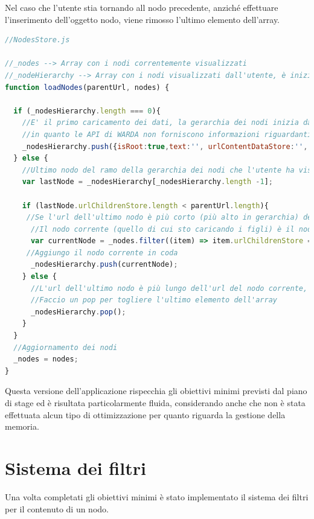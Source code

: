 Nel caso che l'utente stia tornando all nodo precedente, anziché effettuare l'inserimento dell'oggetto nodo, viene rimosso l'ultimo elemento dell'array. 

\begin{lstlisting}[language=JavaScript, caption=NodesStore - Caricamento dei nodi]
//NodesStore.js

//_nodes --> Array con i nodi correntemente visualizzati
//_nodeHierarchy --> Array con i nodi visualizzati dall'utente, è inizializzato come array vuoto
function loadNodes(parentUrl, nodes) {

  if (_nodesHierarchy.length === 0){
    //E' il primo caricamento dei dati, la gerarchia dei nodi inizia da un nodo "finto" che funziona da radice
    //in quanto le API di WARDA non forniscono informazioni riguardanti il nodo radice di una gallery
    _nodesHierarchy.push({isRoot:true,text:'', urlContentDataStore:'', urlChildrenStore:''});
  } else {
    //Ultimo nodo del ramo della gerarchia dei nodi che l'utente ha visualizzato
    var lastNode = _nodesHierarchy[_nodesHierarchy.length -1];

    if (lastNode.urlChildrenStore.length < parentUrl.length){
     //Se l'url dell'ultimo nodo è più corto (più alto in gerarchia) dell'url del nodo corrente, vuol dire che l'utente sta scendendo lungo il ramo
      //Il nodo corrente (quello di cui sto caricando i figli) è il nodo che ha urlContentDataStore == parentUrl e che si trova correntemente in memoria
      var currentNode = _nodes.filter((item) => item.urlChildrenStore === parentUrl)[0];
     //Aggiungo il nodo corrente in coda
      _nodesHierarchy.push(currentNode);
    } else {
      //L'url dell'ultimo nodo è più lungo dell'url del nodo corrente, vuol dire che sto risalendo lungo il ramo
      //Faccio un pop per togliere l'ultimo elemento dell'array
      _nodesHierarchy.pop();
    }
  }
  //Aggiornamento dei nodi
  _nodes = nodes;
}
\end{lstlisting}

Questa versione dell'applicazione rispecchia gli obiettivi minimi previsti dal piano di stage ed è risultata particolarmente fluida, considerando anche che non è stata effettuata alcun tipo di ottimizzazione per quanto riguarda la gestione della memoria.

\section{Sistema dei filtri}

Una volta completati gli obiettivi minimi è stato implementato il sistema dei filtri per il contenuto di un nodo.

